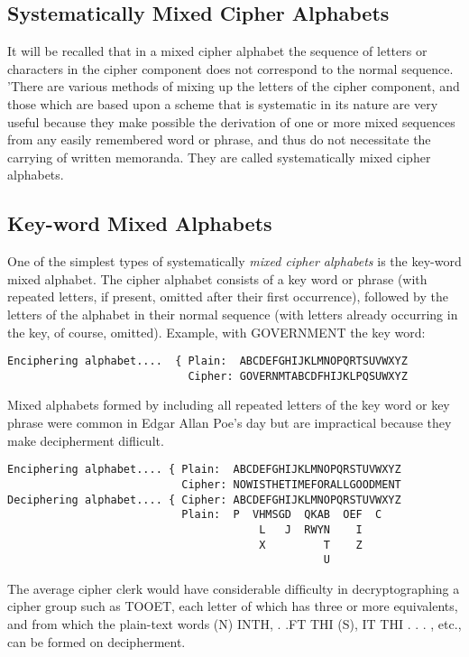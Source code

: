 \subsection{Systematically Mixed Cipher Alphabets}

It will be recalled that in a mixed cipher alphabet the sequence of
letters or characters in the cipher component does not correspond to the
normal sequence. 'There are various methods of mixing up the letters of
the cipher component, and those which are based upon a scheme that is
systematic in its nature are very useful because they make possible the
derivation of one or more mixed sequences from any easily remembered
word or phrase, and thus do not necessitate the carrying of written
memoranda. They are called systematically mixed cipher alphabets.

\subsection{Key-word Mixed Alphabets}

\mypara One of the simplest types of systematically \textit{mixed cipher alphabets}
is the key-word mixed alphabet. The cipher alphabet consists of a key
word or phrase (with repeated letters, if present, omitted after their ﬁrst
occurrence), followed by the letters of the alphabet in their normal
sequence (with letters already occurring in the key, of course, omitted).
Example, with GOVERNMENT the key word:
\begin{verbatim}
Enciphering alphabet....  { Plain:  ABCDEFGHIJKLMNOPQRTSUVWXYZ
                            Cipher: GOVERNMTABCDFHIJKLPQSUWXYZ
\end{verbatim}

\mypara Mixed alphabets formed by including all repeated letters of the key
word or key phrase were common in Edgar Allan Poe’s day but are
impractical because they make decipherment diﬂicult.

\begin{verbatim}
Enciphering alphabet.... { Plain:  ABCDEFGHIJKLMNOPQRSTUVWXYZ
                           Cipher: NOWISTHETIMEFORALLGOODMENT
Deciphering alphabet.... { Cipher: ABCDEFGHIJKLMNOPQRSTUVWXYZ
                           Plain:  P  VHMSGD  QKAB  OEF  C
                                       L   J  RWYN    I
                                       X         T    Z
                                                 U
\end{verbatim}

The average cipher clerk would have considerable difﬁculty in decryptographing a cipher group such as TOOET, each letter of which has three
or more equivalents, and from which the plain-text words (N) INTH,
. .FT THI (S), IT THI . . . , etc., can be formed on decipherment.

